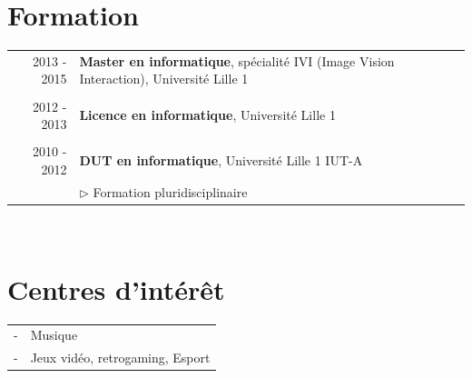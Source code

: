\documentclass[9pt]{article}
\begin{document}
\section{Formation}
\begin{tabular}{rl}
 	
	2013 - 2015& \textbf{Master en informatique}, spécialité IVI (Image Vision Interaction), {\small Université Lille 1}\\ & \\
	
	2012 - 2013& \textbf{Licence en informatique}, {\small Université Lille 1}\\ & \\
        
	2010 - 2012& \textbf{{\small DUT en informatique}}, {\small Université Lille 1 IUT-A}\\			
	&{$\rhd$ \small Formation pluridisciplinaire}\\

\end{tabular}\\[10pt]

\vspace{-0.3cm}

%
%

\section{Centres d'intérêt}
\begin{tabular}{rl}	
	-& Musique\\		
	-& Jeux vidéo, retrogaming, Esport		
\end{tabular}\\[10pt]
\end{document}
